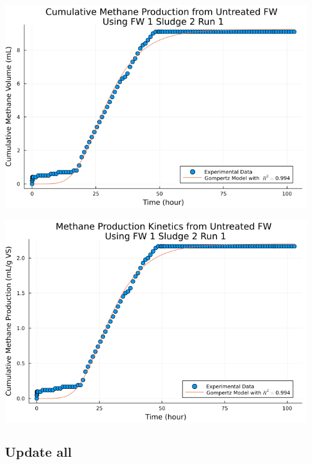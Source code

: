 \documentclass[11pt]{article}
\begin{document}
\begin{center}
\includegraphics[width=.9\linewidth]{../plots/BMPs/Untreated FW/methane_kinetics_untreated_fw_s2_r1_hour.png}
\end{center}

\begin{center}
\includegraphics[width=.9\linewidth]{../plots/BMPs/Untreated FW/specific_methane_kinetics_untreated_fw_s2_r1_hour.png}
\end{center}

\subsection{Update all}
\label{sec:org227e0f3}
\end{document}
